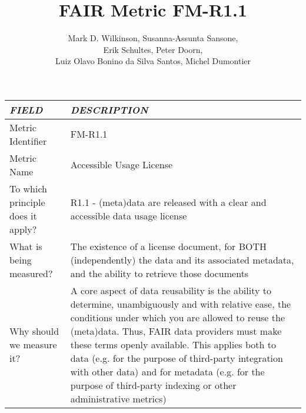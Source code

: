 \documentclass[english]{article}
\begin{document}
\title{FAIR Metric FM-R1.1}

\author{Mark D. Wilkinson, Susanna-Assunta Sansone, \\Erik Schultes, Peter Doorn,\\ 
Luiz Olavo Bonino da Silva Santos, Michel Dumontier}

\maketitle

\newpage





\begin{longtable}{|p{5cm}|p{9cm}|}


\hline
\emph{FIELD} & \emph{DESCRIPTION} \\
\hline
Metric Identifier &   FM-R1.1
\\


\hline
Metric Name &   

Accessible Usage License


 \\



\hline
To which principle does it apply? &   



R1.1 - (meta)data are released with a clear and accessible data usage license

\\



\hline
What is being measured? & 

The existence of a license document, for BOTH (independently) the data and its associated metadata, and the ability to retrieve those documents


\\



\hline
Why should we measure it? & 


A core aspect of data reusability is the ability to determine, unambiguously and with relative ease, the conditions under which you are allowed to reuse the (meta)data.  Thus, FAIR data providers must make these terms openly available.  This applies both to data (e.g. for the purpose of third-party integration with other data) and for metadata (e.g. for the purpose of third-party indexing or other administrative metrics)

  
\\




\end{longtable}
\end{document}
